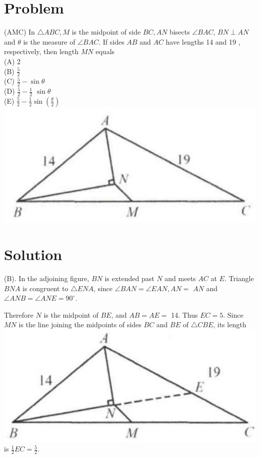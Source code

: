 \documentclass{article}
\begin{document}
\section*{Problem}
(AMC) In \(\triangle A B C, M\) is the midpoint of side \(B C, A N\) bisects \(\angle B A C\), \(B N \perp A N\) and \(\theta\) is the measure of \(\angle B A C\). If sides \(A B\) and \(A C\) have lengths 14 and 19 , respectively, then length \(M N\) equals\\
(A) 2\\
(B) \(\frac{5}{2}\)\\
(C) \(\frac{5}{2}-\sin \theta\)\\
(D) \(\frac{5}{2}-\frac{1}{2}\) \(\sin \theta\)\\
(E) \(\frac{5}{2}-\frac{1}{2} \sin \left(\frac{\theta}{2}\right)\)\\
\centering
\includegraphics[width=\textwidth]{images/064.jpg}

\section*{Solution}
(B).
In the adjoining figure, \(B N\) is extended past \(N\) and meets \(A C\) at \(E\). Triangle \(B N A\) is congruent to \(\triangle E N A\), since \(\angle B A N=\angle E A N, A N=\) \(A N\) and \(\angle A N B=\angle A N E=90^{\circ}\).

Therefore \(N\) is the midpoint of \(B E\), and \(A B=A E=\) 14. Thus \(E C=5\). Since \(M N\) is the line joining the midpoints of sides \(B C\) and \(B E\) of \(\triangle C B E\), its length\\
\includegraphics[width=\textwidth]{images/067(2).jpg} is \(\frac{1}{2} E C=\frac{5}{2}\).
\end{document}
